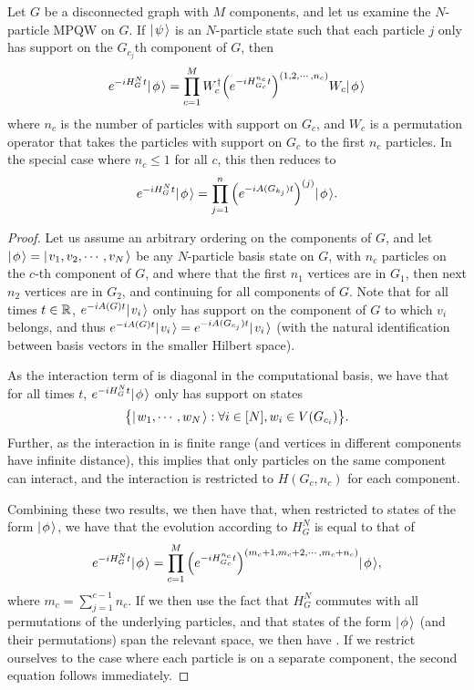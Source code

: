 \documentclass[../thesis-main/thesis-main]{subfiles}
\begin{document}
\begin{lemma}
  Let $G$ be a disconnected graph with $M$ components, and let us examine the $N$-particle MPQW on $G$.  If $|\mspace{2mu} \psi \mspace{2mu} \rangle$ is an $N$-particle state such that each particle $j$ only has support on the $G_{c_j}$th component of $G$, then 
  \begin{align}
    e^{-i H_G^N t} |\mspace{2mu} \phi \mspace{2mu} \rangle = \prod_{c=1}^M W_{c}^\dag \Big(e^{- i H_{G_c}^{n_c} t } \Big)^{(1,2,\cdots,n_c)} W_{c} |\mspace{2mu} \phi \mspace{2mu} \rangle\label{eq:MPQW_disconnect_evolution}
  \end{align}
  where $n_c$ is the number of particles with support on $G_c$, and $W_c$ is a permutation operator that takes the particles with support on $G_c$ to the first $n_c$ particles.  In the special case where $n_c \leq 1$ for all $c$, this then reduces to
  \begin{align}
    e^{-i H_G^N t} |\mspace{2mu} \phi \mspace{2mu} \rangle = \prod_{j=1}^n \Big( e^{-i A(G_{k_j}) t}\Big)^{(j)} |\mspace{2mu} \phi \mspace{2mu} \rangle.
  \end{align}
\label{lem:disconnected_MPQW}
\end{lemma}
\begin{proof}
  Let us assume an arbitrary ordering on the components of $G$, and let $|\mspace{2mu} \phi \mspace{2mu} \rangle = |\mspace{2mu} v_1,v_2,\cdots , v_N \mspace{2mu} \rangle$ be any $N$-particle basis state on $G$, with $n_c$ particles on the $c$-th component of $G$, and where that the first $n_1$ vertices are in $G_1$, then next $n_2$ vertices are in $G_2$, and continuing for all components of $G$.  Note that for all times $t\in \mathbb{R}$, $e^{-i A(G) t} |\mspace{2mu} v_i \mspace{2mu} \rangle$ only has support on the component of $G$ to which $v_i$ belongs, and thus $e^{-i A(G) t} |\mspace{2mu} v_i \mspace{2mu} \rangle = e^{-i A(G_{c_j})t} |\mspace{2mu} v_i \mspace{2mu} \rangle$ (with the natural identification between basis vectors in the smaller Hilbert space).

As the interaction term of  is diagonal in the computational basis, we have that for all times $t$, $e^{-i H_G^N t} |\mspace{2mu} \phi \mspace{2mu} \rangle$ only has support on states 
  \begin{align}
    \big\{ |\mspace{2mu} w_1,\cdots, w_N \mspace{2mu} \rangle : \forall i\in [N],  w_i \in V(G_{c_i}) \big\}.
  \end{align}
  Further, as the interaction in  is finite range (and vertices in different components have infinite distance), this implies that only particles on the same component can interact, and the interaction is restricted to $H(G_c,n_c)$ for each component.

  
  Combining these two results, we then have that, when restricted to states of the form $|\mspace{2mu} \phi \mspace{2mu} \rangle$, we have that the evolution according to $H_G^N$ is equal to that of
  \begin{align}
    e^{-i H_G^N t} |\mspace{2mu} \phi \mspace{2mu} \rangle = \prod_{c=1}^M \Big(e^{-i H_{G_c}^{n_c} t}\Big)^{(  m_c+1,m_c+2,\cdots, m_c+n_c)} |\mspace{2mu} \phi \mspace{2mu} \rangle, 
  \end{align}
  where $m_c = \sum_{j=1}^{c-1} n_c$. If we then use the fact that $H_G^N$ commutes with all permutations of the underlying particles, and that states of the form $|\mspace{2mu} \phi \mspace{2mu} \rangle$ (and their permutations) span the relevant space, we then have .  If we restrict ourselves to the case where each particle is on a separate component, the second equation follows immediately.
\end{proof}
\end{document}
